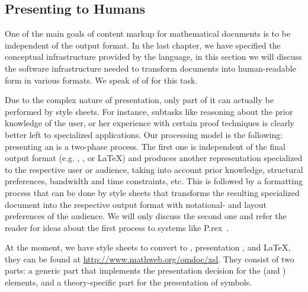 \subsection{Presenting {\else{\omdoc}\fi} to Humans}\label{sec:omdoc2pres}

One of the main goals of content markup for mathematical documents is to be
independent of the output format. In the last chapter, we have specified the
conceptual infrastructure provided by the {\omdoc} language, in this section we
will discuss the software infrastructure needed to transform {\omdoc} documents
into human-readable form in various formats. We speak of of {\omdoc}
{} for this task.

Due to the complex nature of {\omdoc} presentation, only part of it
can actually be performed by {\xslt} style sheets. For instance,
subtasks like reasoning about the prior knowledge of the user, or her
experience with certain proof techniques is clearly better left to
specialized applications. Our processing model is the following:
presenting an {\omdoc} is a two-phase process. The first one is
independent of the final output format (e.g. {\html}, {\mathml}, or
{\LaTeX}) and produces another {\omdoc} representation specialized to
the respective user or audience, taking into account prior knowledge,
structural preferences, bandwidth and time constraints, etc.  This is
followed by a formatting process that can be done by {\xslt} style
sheets that transforms the resulting specialized document into the
respective output format with notational- and layout preferences of
the audience. We will only discuss the second one and refer the reader
for ideas about the first process to systems like
P.rex~\cite{Fiedler:ddaoeo01,FiedlerHoracek:aietlp01}.

At the moment, we have {\xslt} style sheets to convert {\omdoc} to {\html},
presentation {\mathml}, and {\LaTeX}, they can be found at
{\url{http://www.mathweb.org/omdoc/xsl}}.  They consist of two parts: a generic
part that implements the presentation decision for the {\omdoc} (and {\openmath})
elements, and a theory-specific part for the presentation of {\openmath} symbols.

